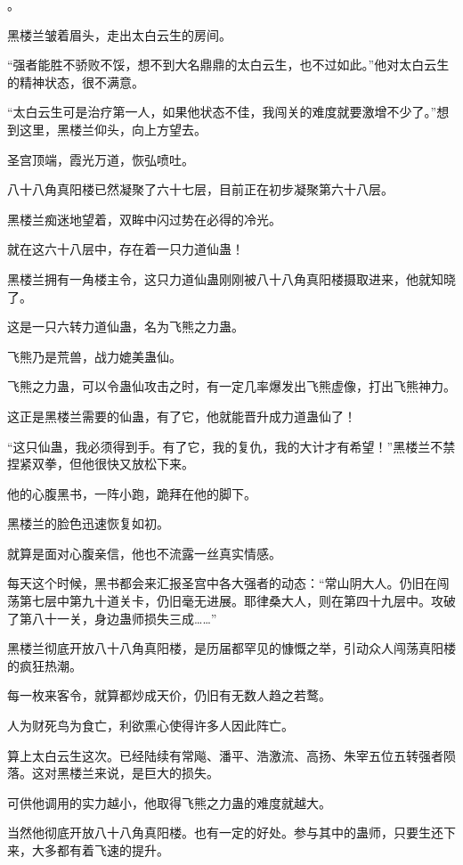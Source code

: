 
\begin{this_body}

。

黑楼兰皱着眉头，走出太白云生的房间。

“强者能胜不骄败不馁，想不到大名鼎鼎的太白云生，也不过如此。”他对太白云生的精神状态，很不满意。

“太白云生可是治疗第一人，如果他状态不佳，我闯关的难度就要激增不少了。”想到这里，黑楼兰仰头，向上方望去。

圣宫顶端，霞光万道，恢弘喷吐。

八十八角真阳楼已然凝聚了六十七层，目前正在初步凝聚第六十八层。

黑楼兰痴迷地望着，双眸中闪过势在必得的冷光。

就在这六十八层中，存在着一只力道仙蛊！

黑楼兰拥有一角楼主令，这只力道仙蛊刚刚被八十八角真阳楼摄取进来，他就知晓了。

这是一只六转力道仙蛊，名为飞熊之力蛊。

飞熊乃是荒兽，战力媲美蛊仙。

飞熊之力蛊，可以令蛊仙攻击之时，有一定几率爆发出飞熊虚像，打出飞熊神力。

这正是黑楼兰需要的仙蛊，有了它，他就能晋升成力道蛊仙了！

“这只仙蛊，我必须得到手。有了它，我的复仇，我的大计才有希望！”黑楼兰不禁捏紧双拳，但他很快又放松下来。

他的心腹黑书，一阵小跑，跪拜在他的脚下。

黑楼兰的脸色迅速恢复如初。

就算是面对心腹亲信，他也不流露一丝真实情感。

每天这个时候，黑书都会来汇报圣宫中各大强者的动态：“常山阴大人。仍旧在闯荡第七层中第九十道关卡，仍旧毫无进展。耶律桑大人，则在第四十九层中。攻破了第八十一关，身边蛊师损失三成……”

黑楼兰彻底开放八十八角真阳楼，是历届都罕见的慷慨之举，引动众人闯荡真阳楼的疯狂热潮。

每一枚来客令，就算都炒成天价，仍旧有无数人趋之若鹜。

人为财死鸟为食亡，利欲熏心使得许多人因此阵亡。

算上太白云生这次。已经陆续有常飚、潘平、浩激流、高扬、朱宰五位五转强者陨落。这对黑楼兰来说，是巨大的损失。

可供他调用的实力越小，他取得飞熊之力蛊的难度就越大。

当然他彻底开放八十八角真阳楼。也有一定的好处。参与其中的蛊师，只要生还下来，大多都有着飞速的提升。


\end{this_body}
